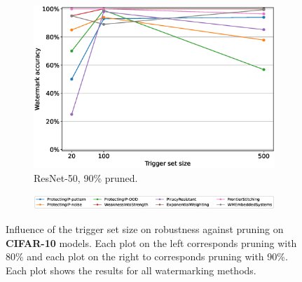 \begin{figure}
\begin{subfigure}{0.4\linewidth}
        \includegraphics[width=\linewidth]{images/pruning/resnet50_pruning_per_arch_09.eps}
        \caption{ResNet-50, 90\% pruned.}
        \label{fig:pruning-0.9-resnet50}
    \end{subfigure}
    
    \begin{subfigure}{\linewidth}
    \centering
    \includegraphics[width=0.7\linewidth]{images/pruning/legend_pruning_per_arch.eps}
    \end{subfigure}
    
    \caption{Influence of the trigger set size on robustness against pruning on \textbf{CIFAR-10} models. Each plot on the left corresponds pruning with 80\% and each plot on the right to corresponds pruning with 90\%. Each plot shows the results for all watermarking methods.}
    \label{fig:pruning-cifar10models-perarch}
\end{figure}

